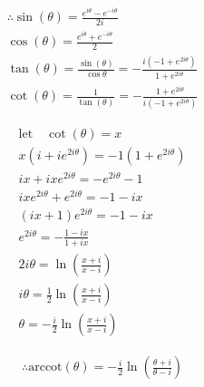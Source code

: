 \documentclass{../../style}
\begin{document}
\euler

\begin{gather*}
	\therefore \sin(\theta) = \frac{e^{i\theta} - e^{-i\theta}}{2i} \\
	\cos(\theta) = \frac{e^{i\theta} + e^{-i\theta}}{2} \\
	\tan(\theta) = \frac{\sin(\theta)}{\cos{\theta}} = -\frac{i(-1 + e^{2i\theta})}{1 + e^{2i\theta}} \\
	\cot(\theta) = \frac{1}{\tan(\theta)} = -\frac{1 + e^{2i\theta}}{i(-1 + e^{2i\theta})}
\end{gather*}

\begin{gather*}
	\text{let} \quad \cot(\theta) = x \\
	x(i + ie^{2i\theta}) = -1(1 + e^{2i\theta}) \\
	ix + ixe^{2i\theta} = -e^{2i\theta} - 1 \\
	ixe^{2i\theta} + e^{2i\theta} = -1 - ix \\
	(ix + 1)e^{2i\theta} = -1 - ix \\
	e^{2i\theta} = -\frac{1 - ix}{1 + ix} \\
	2i\theta = \ln(\frac{x + i}{x - i}) \\
	i\theta = \frac{1}{2}\ln(\frac{x + i}{x - i}) \\
	\theta = -\frac{i}{2}\ln(\frac{x + i}{x - i})
\end{gather*}

\begin{gather*}
	\therefore \text{arccot}(\theta) = -\frac{i}{2}\ln(\frac{\theta + i}{\theta - i})
\end{gather*}
\end{document}

